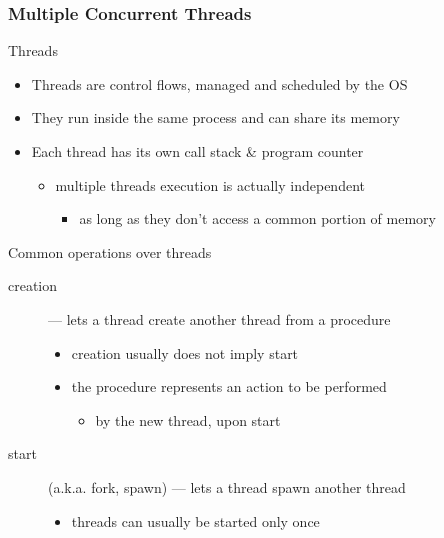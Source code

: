 \documentclass[presentation]{beamer}\mode<presentation>{\usetheme{AMSBolognaFC}}
\begin{document}
\begin{frame}[allowframebreaks]
    \frametitle{Multiple Concurrent Threads}

    \begin{block}{Threads}
        \begin{itemize}
            \item Threads are control flows, managed and scheduled by the OS
            \item They run inside the same process and can share its memory
            \item Each thread has its own call stack \& program counter
            \begin{itemize}
                \item multiple threads execution is actually independent
                \begin{itemize}
                    \item as long as they don't access a common portion of memory
                \end{itemize}
            \end{itemize}
        \end{itemize}
    \end{block}

    \begin{exampleblock}{Common operations over threads}
        \begin{description}
            \item[creation] --- lets a thread create another thread from a \alert{procedure}
            \begin{itemize}
                \item creation usually does not imply start
                \item the procedure represents an action to be performed
                \begin{itemize}
                    \item by the new thread, upon start
                \end{itemize}
            \end{itemize}

            \item[start] (a.k.a. fork, spawn) --- lets a thread spawn another thread
            \begin{itemize}
                \item threads can usually be started only once
            \end{itemize}


\end{description}
\end{exampleblock}
\end{frame}
\end{document}

